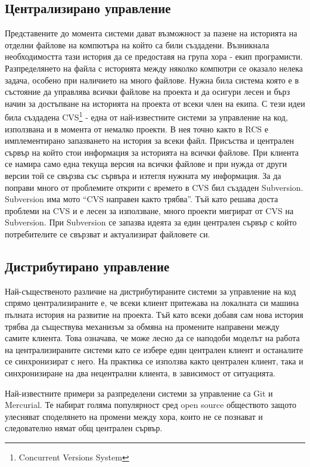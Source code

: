 \documentclass[a4paper]{article}
\begin{document}
  \subsection{Централизирано управление} Представените до момента системи дават
  възможност за пазене на историята на отделни файлове на компютъра на който са
  били създадени. Възникнала необходимостта тази история да се предоставя на
  група хора - екип програмисти. Разпределянето на файла с историята между
  няколко компютри се оказало нелека задача, особено при наличието на много
  файлове. Нужна била система която е в състояние да управлява всички файлове
  на проекта и да осигури лесен и бърз начин за достъпване на историята на
  проекта от всеки член на екипа. С тези идеи била създадена
  CVS\footnote{Concurrent Versions System\cite{cvs}} - една от най-известните
  системи за управление на код, използвана и в момента от немалко проекти.
  В нея точно както в RCS е имплементирано запазването на история за всеки
  файл. Присъства и централен сървър на който стои информация за историята на
  всички файлове. При клиента се намира само една текуща версия на всички
  файлове и при нужда от други версии той се свързва със сървъра и изтегля
  нужната му информация. За да поправи много от проблемите открити с времето
  в CVS бил създаден Subversion\cite{svn}. Subversion има мото ``CVS направен
  както трябва''. Тъй като решава доста проблеми на CVS и е лесен за използване,
  много проекти мигрират от CVS на Subversion. При Subversion се запазва идеята
  за един централен сървър с който потребителите се свързват и актуализират
  файловете си.

  \subsection{Дистрибутирано управление}
  Най-същественото различие на дистрибутираните системи за управление на код
  спрямо централизираните е, че всеки клиент притежава на локалната си машина
  пълната история на развитие на проекта.  Тъй като всеки добавя сам нова
  история трябва да съществува механизъм за обмяна на промените направени между
  самите клиента. Това означава, че може лесно да се наподоби моделът на работа
  на централизираните системи като се избере един централен клиент и останалите
  се синхронизират с него. На практика се използва както централен клиент, така
  и синхронизиране на два нецентрални клиента, в зависимост от ситуацията.
  
  Най-известните примери за разпределени системи за управление са
  Git\cite{git} и Mercurial\cite{mercurial}. Те набират голяма популярност
  сред open source обществото защото улесняват споделянето на промени между
  хора, които не се познават и следователно нямат общ централен сървър.
\end{document}
